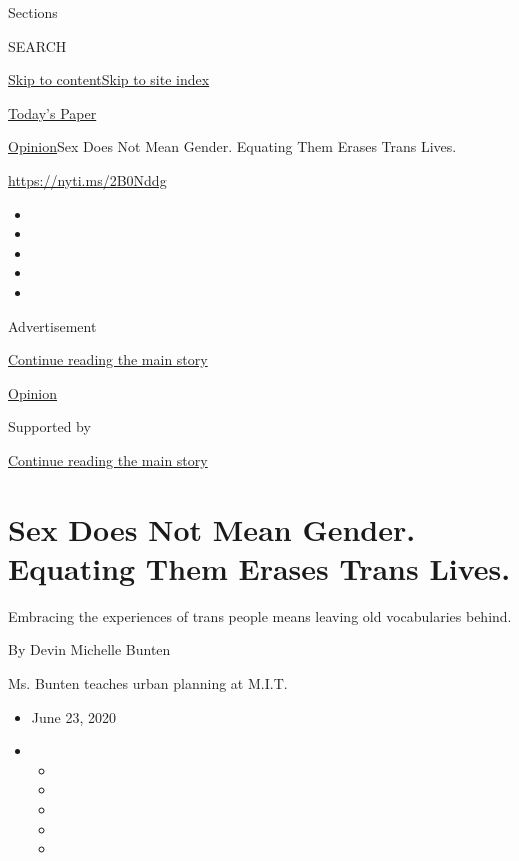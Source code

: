 Sections

SEARCH

\protect\hyperlink{site-content}{Skip to
content}\protect\hyperlink{site-index}{Skip to site index}

\href{https://myaccount.nytimes3xbfgragh.onion/auth/login?response_type=cookie\&client_id=vi}{}

\href{https://www.nytimes3xbfgragh.onion/section/todayspaper}{Today's
Paper}

\href{/section/opinion}{Opinion}\textbar{}Sex Does Not Mean Gender.
Equating Them Erases Trans Lives.

\url{https://nyti.ms/2B0Nddg}

\begin{itemize}
\item
\item
\item
\item
\item
\end{itemize}

Advertisement

\protect\hyperlink{after-top}{Continue reading the main story}

\href{/section/opinion}{Opinion}

Supported by

\protect\hyperlink{after-sponsor}{Continue reading the main story}

\hypertarget{sex-does-not-mean-gender-equating-them-erases-trans-lives}{%
\section{Sex Does Not Mean Gender. Equating Them Erases Trans
Lives.}\label{sex-does-not-mean-gender-equating-them-erases-trans-lives}}

Embracing the experiences of trans people means leaving old vocabularies
behind.

By Devin Michelle Bunten

Ms. Bunten teaches urban planning at M.I.T.

\begin{itemize}
\item
  June 23, 2020
\item
  \begin{itemize}
  \item
  \item
  \item
  \item
  \item
  \end{itemize}
\end{itemize}

